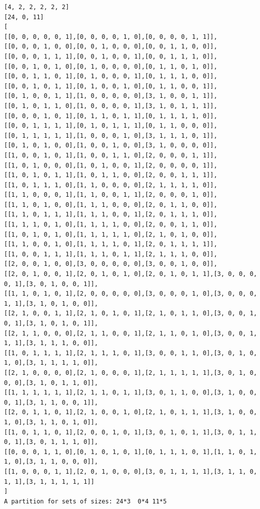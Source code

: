 \documentclass[final]{dmtcs-episciences}
\begin{document}
\begin{appendices}
\begin{verbatim} 
[4, 2, 2, 2, 2, 2]
[24, 0, 11]
[
[[0, 0, 0, 0, 0, 1],[0, 0, 0, 0, 1, 0],[0, 0, 0, 0, 1, 1]],
[[0, 0, 0, 1, 0, 0],[0, 0, 1, 0, 0, 0],[0, 0, 1, 1, 0, 0]],
[[0, 0, 0, 1, 1, 1],[0, 0, 1, 0, 0, 1],[0, 0, 1, 1, 1, 0]],
[[0, 0, 1, 0, 1, 0],[0, 1, 0, 0, 0, 0],[0, 1, 1, 0, 1, 0]],
[[0, 0, 1, 1, 0, 1],[0, 1, 0, 0, 0, 1],[0, 1, 1, 1, 0, 0]],
[[0, 0, 1, 0, 1, 1],[0, 1, 0, 0, 1, 0],[0, 1, 1, 0, 0, 1]],
[[0, 1, 0, 0, 1, 1],[1, 0, 0, 0, 0, 0],[3, 1, 0, 0, 1, 1]],
[[0, 1, 0, 1, 1, 0],[1, 0, 0, 0, 0, 1],[3, 1, 0, 1, 1, 1]],
[[0, 0, 0, 1, 0, 1],[0, 1, 1, 0, 1, 1],[0, 1, 1, 1, 1, 0]],
[[0, 0, 1, 1, 1, 1],[0, 1, 0, 1, 1, 1],[0, 1, 1, 0, 0, 0]],
[[0, 1, 1, 1, 1, 1],[1, 0, 0, 0, 1, 0],[3, 1, 1, 1, 0, 1]],
[[0, 1, 0, 1, 0, 0],[1, 0, 0, 1, 0, 0],[3, 1, 0, 0, 0, 0]],
[[1, 0, 0, 1, 0, 1],[1, 0, 0, 1, 1, 0],[2, 0, 0, 0, 1, 1]],
[[1, 0, 1, 0, 0, 0],[1, 0, 1, 0, 0, 1],[2, 0, 0, 0, 0, 1]],
[[1, 0, 1, 0, 1, 1],[1, 0, 1, 1, 0, 0],[2, 0, 0, 1, 1, 1]],
[[1, 0, 1, 1, 1, 0],[1, 1, 0, 0, 0, 0],[2, 1, 1, 1, 1, 0]],
[[1, 1, 0, 0, 0, 1],[1, 1, 0, 0, 1, 1],[2, 0, 0, 0, 1, 0]],
[[1, 1, 0, 1, 0, 0],[1, 1, 1, 0, 0, 0],[2, 0, 1, 1, 0, 0]],
[[1, 1, 0, 1, 1, 1],[1, 1, 1, 0, 0, 1],[2, 0, 1, 1, 1, 0]],
[[1, 1, 1, 0, 1, 0],[1, 1, 1, 1, 0, 0],[2, 0, 0, 1, 1, 0]],
[[1, 0, 1, 0, 1, 0],[1, 1, 1, 1, 1, 0],[2, 1, 0, 1, 0, 0]],
[[1, 1, 0, 0, 1, 0],[1, 1, 1, 1, 0, 1],[2, 0, 1, 1, 1, 1]],
[[1, 0, 0, 1, 1, 1],[1, 1, 1, 0, 1, 1],[2, 1, 1, 1, 0, 0]],
[[2, 0, 0, 1, 0, 0],[3, 0, 0, 0, 0, 0],[3, 0, 0, 1, 0, 0]],
[[2, 0, 1, 0, 0, 1],[2, 0, 1, 0, 1, 0],[2, 0, 1, 0, 1, 1],[3, 0, 0, 0, 0, 1],[3, 0, 1, 0, 0, 1]],
[[1, 1, 0, 1, 0, 1],[2, 0, 0, 0, 0, 0],[3, 0, 0, 0, 1, 0],[3, 0, 0, 0, 1, 1],[3, 1, 0, 1, 0, 0]],
[[2, 1, 0, 0, 1, 1],[2, 1, 0, 1, 0, 1],[2, 1, 0, 1, 1, 0],[3, 0, 0, 1, 0, 1],[3, 1, 0, 1, 0, 1]],
[[2, 1, 1, 0, 0, 0],[2, 1, 1, 0, 0, 1],[2, 1, 1, 0, 1, 0],[3, 0, 0, 1, 1, 1],[3, 1, 1, 1, 0, 0]],
[[1, 0, 1, 1, 1, 1],[2, 1, 1, 1, 0, 1],[3, 0, 0, 1, 1, 0],[3, 0, 1, 0, 1, 0],[3, 1, 1, 1, 1, 0]],
[[2, 1, 0, 0, 0, 0],[2, 1, 0, 0, 0, 1],[2, 1, 1, 1, 1, 1],[3, 0, 1, 0, 0, 0],[3, 1, 0, 1, 1, 0]],
[[1, 1, 1, 1, 1, 1],[2, 1, 1, 0, 1, 1],[3, 0, 1, 1, 0, 0],[3, 1, 0, 0, 0, 1],[3, 1, 1, 0, 0, 1]],
[[2, 0, 1, 1, 0, 1],[2, 1, 0, 0, 1, 0],[2, 1, 0, 1, 1, 1],[3, 1, 0, 0, 1, 0],[3, 1, 1, 0, 1, 0]],
[[1, 0, 1, 1, 0, 1],[2, 0, 0, 1, 0, 1],[3, 0, 1, 0, 1, 1],[3, 0, 1, 1, 0, 1],[3, 0, 1, 1, 1, 0]],
[[0, 0, 0, 1, 1, 0],[0, 1, 0, 1, 0, 1],[0, 1, 1, 1, 0, 1],[1, 1, 0, 1, 1, 0],[3, 1, 1, 0, 0, 0]],
[[1, 0, 0, 0, 1, 1],[2, 0, 1, 0, 0, 0],[3, 0, 1, 1, 1, 1],[3, 1, 1, 0, 1, 1],[3, 1, 1, 1, 1, 1]]
]
A partition for sets of sizes: 24*3  0*4 11*5
\end{verbatim}
\newpage


\end{appendices}
\end{document}
